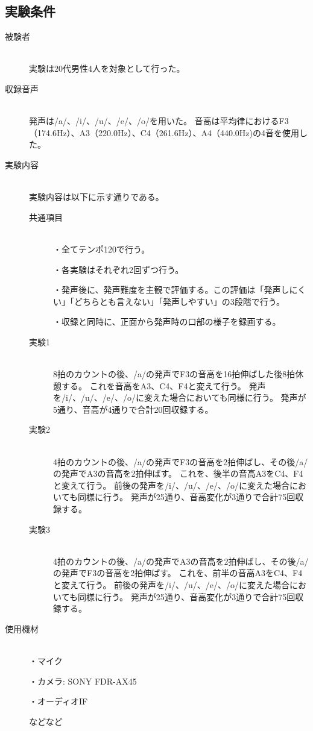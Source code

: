 \documentclass[10ptj,a4j,dvipdfmx,uplatex, draft]{jsbook}%
\begin{document}
\subsection{実験条件}
\begin{description}
    \item[被験者]\mbox{}\\
        実験は20代男性4人を対象として行った。
    \item[収録音声]\mbox{}\\
        発声は/a/、/i/、/u/、/e/、/o/を用いた。
        音高は平均律におけるF3（174.6Hz）、A3（220.0Hz）、C4（261.6Hz）、A4（440.0Hz)の4音を使用した。
    \item[実験内容]\mbox{}\\
        実験内容は以下に示す通りである。
        \begin{description}
            \item[共通項目]\mbox{}\\
                ・全てテンポ120で行う。
                
                ・各実験はそれぞれ2回ずつ行う。
                
                ・発声後に、発声難度を主観で評価する。この評価は「発声しにくい」「どちらとも言えない」「発声しやすい」の3段階で行う。
                
                ・収録と同時に、正面から発声時の口部の様子を録画する。
            \item[実験1]\mbox{}\\
                8拍のカウントの後、/a/の発声でF3の音高を16拍伸ばした後8拍休憩する。
                これを音高をA3、C4、F4と変えて行う。
                発声を/i/、/u/、/e/、/o/に変えた場合においても同様に行う。
                発声が5通り、音高が4通りで合計20回収録する。
            \item[実験2]\mbox{}\\
                4拍のカウントの後、/a/の発声でF3の音高を2拍伸ばし、その後/a/の発声でA3の音高を2拍伸ばす。
                これを、後半の音高A3をC4、F4と変えて行う。
                前後の発声を/i/、/u/、/e/、/o/に変えた場合においても同様に行う。
                発声が25通り、音高変化が3通りで合計75回収録する。
            \item[実験3]\mbox{}\\
                4拍のカウントの後、/a/の発声でA3の音高を2拍伸ばし、その後/a/の発声でF3の音高を2拍伸ばす。
                これを、前半の音高A3をC4、F4と変えて行う。
                前後の発声を/i/、/u/、/e/、/o/に変えた場合においても同様に行う。
                発声が25通り、音高変化が3通りで合計75回収録する。
        \end{description}

    \item[使用機材]\mbox{}\\
        ・マイク

        ・カメラ: SONY FDR-AX45

        ・オーディオIF

        などなど
\end{description}
\end{document}
